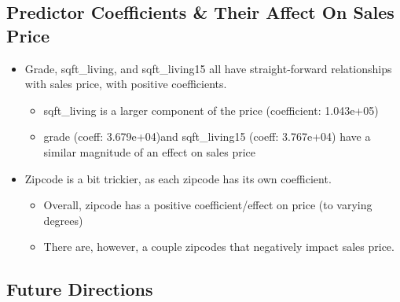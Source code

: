 \documentclass[11pt]{article}
\providecommand{\tightlist}{%
      \setlength{\itemsep}{0pt}\setlength{\parskip}{0pt}}
\begin{document}
    \hypertarget{predictor-coefficients-their-affect-on-sales-price}{%
\subsection{Predictor Coefficients \& Their Affect On Sales
Price}\label{predictor-coefficients-their-affect-on-sales-price}}

\begin{itemize}
\tightlist
\item
  Grade, sqft\_living, and sqft\_living15 all have straight-forward
  relationships with sales price, with positive coefficients.

  \begin{itemize}
  \tightlist
  \item
    sqft\_living is a larger component of the price (coefficient:
    1.043e+05)
  \item
    grade (coeff: 3.679e+04)and sqft\_living15 (coeff: 3.767e+04) have a
    similar magnitude of an effect on sales price
  \end{itemize}
\item
  Zipcode is a bit trickier, as each zipcode has its own coefficient.

  \begin{itemize}
  \tightlist
  \item
    Overall, zipcode has a positive coefficient/effect on price (to
    varying degrees)
  \item
    There are, however, a couple zipcodes that negatively impact sales
    price.
  \end{itemize}
\end{itemize}

    \hypertarget{future-directions}{%
\subsection{Future Directions}\label{future-directions}}
\end{document}
